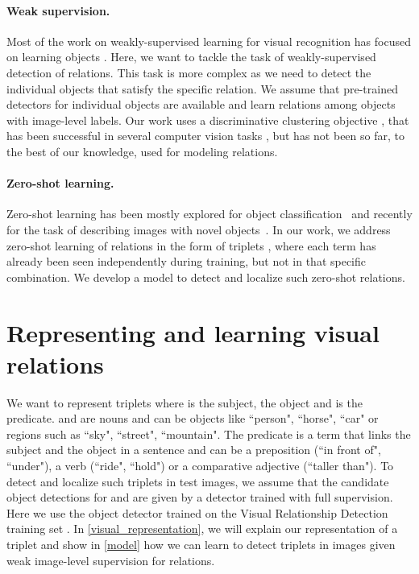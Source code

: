\documentclass[10pt,twocolumn,letterpaper]{article}
\newcommand{\spaceparagraph}{\vspace{-.35cm}}
\begin{document}
\spaceparagraph
\paragraph{Weak supervision.} Most of the work on weakly-supervised learning for visual recognition has focused on learning objects \cite{ Bilen16,fangCVPR15,Oquab15}. Here, we want to tackle the task of weakly-supervised detection of relations. This task is more complex as we need to detect the individual objects that satisfy the specific relation. We assume that pre-trained detectors for individual objects are available and learn relations among objects with image-level labels. Our work uses a discriminative clustering objective \cite{bach2008diffrac}, that has been successful in several computer vision tasks \cite{Bojanowski2014,joulin2014}, but has not been so far, to the best of our knowledge, used for modeling relations.



\spaceparagraph
\paragraph{Zero-shot learning.} Zero-shot learning has been mostly explored for object classification~\cite{Frome2013,Lazaridou2014a,Socher2013a,Xian16} and recently for the task of describing images with novel objects~\cite{Hendricks2015,Venugopalan2016}. In our work, we address zero-shot learning of relations in the form of triplets , where each term has already been seen independently during training, but not in that specific combination. We develop a model to detect and localize such zero-shot relations. 


\section{Representing and learning visual relations}

We want to represent triplets  where  is the
subject,  the object and  is the predicate.  and  are
nouns and can be objects like ``person", ``horse", ``car" or regions such as  ``sky",
``street", ``mountain". The predicate  is a term that links the subject and the object in a sentence and can be a preposition (``in front of", ``under"), a verb (``ride", ``hold") or a comparative adjective (``taller than"). To detect and localize such triplets in test images, we assume that the candidate object detections for  and  are given by a detector trained with full supervision. Here we use the object detector \cite{girshick15fastrcnn} trained on the Visual Relationship Detection training set \cite{Lu16}. In \ref{visual_representation}, we will explain our representation of a triplet   and show in \ref{model} how we can learn to detect triplets in images given weak image-level supervision for relations. 
\end{document}
